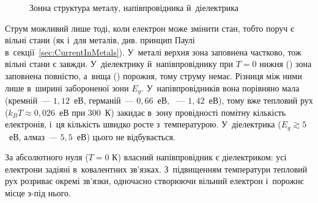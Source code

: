 \begin{figure}[h!]\centering
	\caption{Зонна структура металу, напівпровідника й~діелектрика\label{pic:Bands}}
\end{figure}

Струм можливий лише тоді, коли електрон може змінити стан, тобто поруч є вільні стани (як
і~для металів, див. принцип Паулі в~секції~\ref{sec:CurrentInMetals}). У~металі верхня
зона заповнена частково, тож вільні стани є завжди. У~діелектрику й~напівпровіднику при
$T=0$ нижня () зона заповнена повністю, а~вища ()
порожня, тому струму немає. Різниця між ними лише в~ширині забороненої зони $E_g$.
У~напівпровідників вона порівняно мала (кремній~--- $1{,}12$~еВ, германій~--- $0{,}66$~еВ,
~--- $1{,}42$~еВ), тому вже тепловий рух ($k_BT\approx0{,}026$~еВ при $300$~К)
закидає в~зону провідності помітну кількість електронів, і~ця кількість швидко росте
з~температурою. У~діелектрика ($E_g\gtrsim5$~еВ, алмаз~--- $5{,}5$~еВ) цього не
відбувається.


За абсолютного нуля ($T = 0\text{~К}$) власний напівпровідник є діелектриком: усі
електрони задіяні в~ковалентних зв'язках. З~підвищенням температури тепловий рух розриває
окремі зв'язки, одночасно створюючи вільний електрон і~порожнє місце з-під нього.

